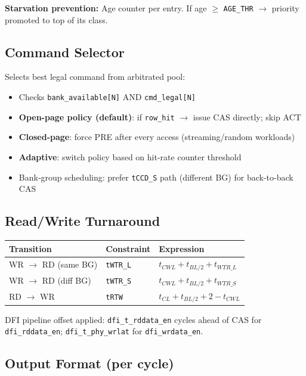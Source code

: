 \documentclass[11pt,a4paper]{article}
\begin{document}
\textbf{Starvation prevention:}
Age counter per entry. If age $\geq$ \texttt{AGE\_THR} $\rightarrow$ priority
promoted to top of its class.

\subsection{Command Selector}

Selects best legal command from arbitrated pool:

\begin{itemize}
  \item Checks \texttt{bank\_available[N]} AND \texttt{cmd\_legal[N]}
  \item \textbf{Open-page policy (default)}: if \texttt{row\_hit} $\rightarrow$ issue
        CAS directly; skip ACT
  \item \textbf{Closed-page}: force PRE after every access (streaming/random
        workloads)
  \item \textbf{Adaptive}: switch policy based on hit-rate counter threshold
  \item Bank-group scheduling: prefer \texttt{tCCD\_S} path (different BG) for
        back-to-back CAS
\end{itemize}

\subsection{Read/Write Turnaround}

\begin{center}
\begin{tabularx}{\linewidth}{@{} l l X @{}}
\toprule
\textbf{Transition} & \textbf{Constraint} & \textbf{Expression} \\
\midrule
WR $\rightarrow$ RD (same BG) & \texttt{tWTR\_L} &
  $t_{CWL} + t_{BL/2} + t_{WTR\_L}$ \\
WR $\rightarrow$ RD (diff BG) & \texttt{tWTR\_S} &
  $t_{CWL} + t_{BL/2} + t_{WTR\_S}$ \\
RD $\rightarrow$ WR           & \texttt{tRTW}    &
  $t_{CL} + t_{BL/2} + 2 - t_{CWL}$ \\
\bottomrule
\end{tabularx}
\end{center}

DFI pipeline offset applied: \texttt{dfi\_t\_rddata\_en} cycles ahead of CAS for
\texttt{dfi\_rddata\_en}; \texttt{dfi\_t\_phy\_wrlat} for \texttt{dfi\_wrdata\_en}.

\subsection{Output Format (per cycle)}
\end{document}
